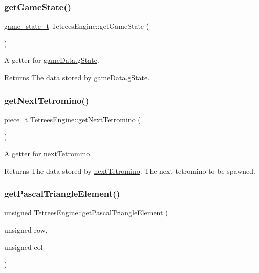 \subsubsection{\texorpdfstring{get\+Game\+State()}{getGameState()}}
{\footnotesize\ttfamily \hyperlink{TetreesDefs_8hpp_aebae08b2e3a36f1452b33acaf1eaab40}{game\+\_\+state\+\_\+t} Tetrees\+Engine\+::get\+Game\+State (\begin{DoxyParamCaption}{ }\end{DoxyParamCaption})}

A getter for \hyperlink{TetreesDefs_8hpp_aebae08b2e3a36f1452b33acaf1eaab40}{game\+Data.g\+State}. \begin{DoxyReturn}{Returns}
The data stored by \hyperlink{TetreesDefs_8hpp_aebae08b2e3a36f1452b33acaf1eaab40}{game\+Data.g\+State}. 
\end{DoxyReturn}
\mbox{\label{classTetreesEngine_a78698174a309f2a4d74da9fd47167f56}} 
\subsubsection{\texorpdfstring{get\+Next\+Tetromino()}{getNextTetromino()}}
{\footnotesize\ttfamily \hyperlink{structpiece__t}{piece\+\_\+t} Tetrees\+Engine\+::get\+Next\+Tetromino (\begin{DoxyParamCaption}{ }\end{DoxyParamCaption})}

A getter for \hyperlink{classTetreesEngine_a44c902481f5d8a72ca8a78d24f5c3a33}{next\+Tetromino}. \begin{DoxyReturn}{Returns}
The data stored by \hyperlink{classTetreesEngine_a44c902481f5d8a72ca8a78d24f5c3a33}{next\+Tetromino}. The next tetromino to be spawned. 
\end{DoxyReturn}
\mbox{\label{classTetreesEngine_a087f12761b955478bff1d4e70e6c0549}} 
\subsubsection{\texorpdfstring{get\+Pascal\+Triangle\+Element()}{getPascalTriangleElement()}}
{\footnotesize\ttfamily unsigned Tetrees\+Engine\+::get\+Pascal\+Triangle\+Element (\begin{DoxyParamCaption}\item[{unsigned}]{row,  }\item[{unsigned}]{col }\end{DoxyParamCaption})\hspace{0.3cm}{\ttfamily [private]}}



